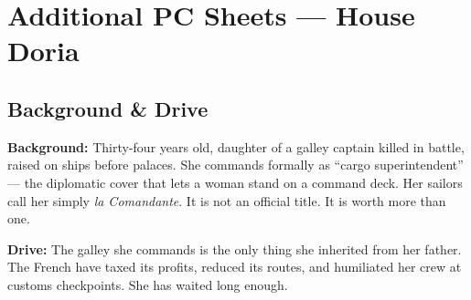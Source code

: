

\chapter{Additional PC Sheets --- House Doria}


\section*{Background \& Drive}
\begin{rulebox}{}
\textbf{Background:} Thirty-four years old, daughter of a galley captain killed in battle,
raised on ships before palaces. She commands formally as ``cargo superintendent'' ---
the diplomatic cover that lets a woman stand on a command deck. Her sailors call her
simply \textit{la Comandante}. It is not an official title. It is worth more than one.

\medskip\noindent\textcolor{DoriaBlue}{\textbf{Drive:}} The galley she commands is the
only thing she inherited from her father. The French have taxed its profits, reduced its
routes, and humiliated her crew at customs checkpoints. She has waited long enough.
\end{rulebox}

